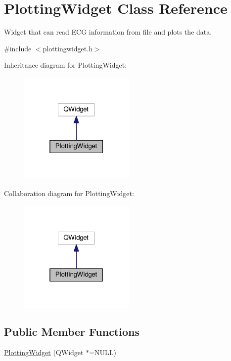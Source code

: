 \hypertarget{classPlottingWidget}{}\section{Plotting\+Widget Class Reference}
\label{classPlottingWidget}


Widget that can read E\+CG information from file and plots the data.  




{\ttfamily \#include $<$plottingwidget.\+h$>$}



Inheritance diagram for Plotting\+Widget\+:
\nopagebreak
\begin{figure}[H]
\begin{center}
\leavevmode
\includegraphics[width=160pt]{classPlottingWidget__inherit__graph}
\end{center}
\end{figure}


Collaboration diagram for Plotting\+Widget\+:
\nopagebreak
\begin{figure}[H]
\begin{center}
\leavevmode
\includegraphics[width=160pt]{classPlottingWidget__coll__graph}
\end{center}
\end{figure}
\subsection*{Public Member Functions}
\begin{DoxyCompactItemize}
\item 
\hyperlink{classPlottingWidget_a094b0449651206a5d5fbad95489d9a05}{Plotting\+Widget} (Q\+Widget $\ast$=N\+U\+LL)
\end{DoxyCompactItemize}
